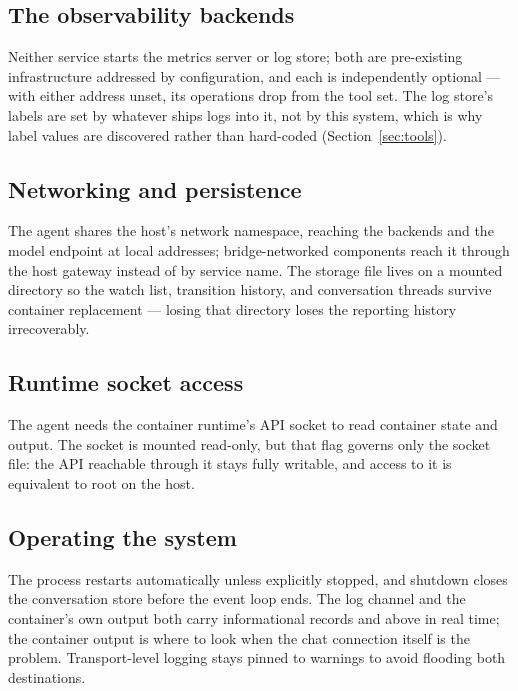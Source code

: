 \documentclass[11pt,a4paper]{article}
\begin{document}
\subsection{The observability backends}

Neither service starts the metrics server or log store; both are pre-existing
infrastructure addressed by configuration, and each is independently optional ---
with either address unset, its operations drop from the tool set. The log store's
labels are set by whatever ships logs into it, not by this system, which is why label
values are discovered rather than hard-coded (Section~\ref{sec:tools}).

\subsection{Networking and persistence}

The agent shares the host's network namespace, reaching the backends and the model
endpoint at local addresses; bridge-networked components reach it through the host
gateway instead of by service name. The storage file lives on a mounted directory so
the watch list, transition history, and conversation threads survive container
replacement --- losing that directory loses the reporting history irrecoverably.

\subsection{Runtime socket access}
\label{sec:socketsec}

The agent needs the container runtime's API socket to read container state and
output. The socket is mounted read-only, but that flag governs only the socket file:
the API reachable through it stays fully writable, and access to it is equivalent to
root on the host.

\subsection{Operating the system}

The process restarts automatically unless explicitly stopped, and shutdown closes the
conversation store before the event loop ends. The log channel and the container's
own output both carry informational records and above in real time; the container
output is where to look when the chat connection itself is the problem.
Transport-level logging stays pinned to warnings to avoid flooding both destinations.
\end{document}
